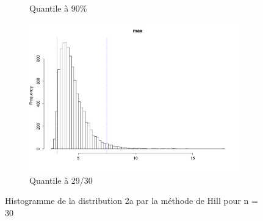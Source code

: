 \documentclass{article}
\renewcommand*{\(}{ \left( }
\renewcommand*{\)}{ \right) }
\begin{document}
\begin{figure}[H]
\begin{subfigure}[t]{0.3\textwidth}
        \caption{Quantile à 90\%}
        \label{fig:BAH90}
    \end{subfigure}%
    \begin{subfigure}[t]{0.3\textwidth}
        \includegraphics[width = \linewidth]{img/BootstrapAHill-Max-30.pdf}
        \caption{Quantile à 29/30}
        \label{fig:BAHMax}
    \end{subfigure}%
    \caption{Histogramme de la distribution 2a par la méthode de Hill pour n = 30}
    \label{fig:BAH}
\end{figure}
\end{document}
